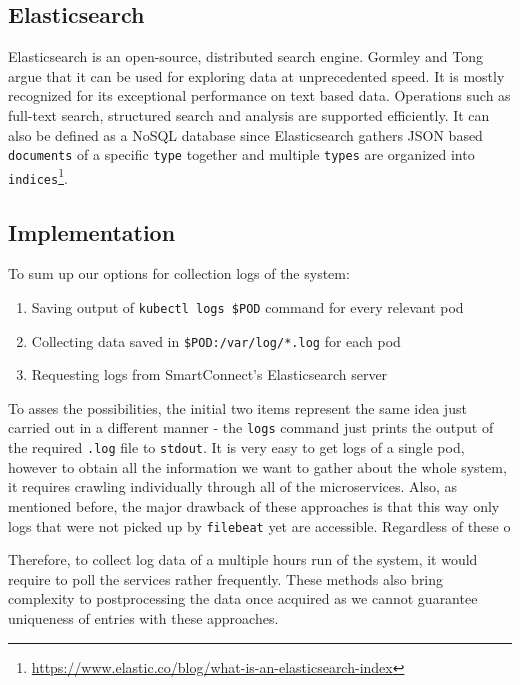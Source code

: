 \subsection{Elasticsearch}
Elasticsearch is an open-source, distributed search engine. Gormley and Tong \cite{gormley2015elasticsearch} argue that it can be used for exploring data at unprecedented speed. It is mostly recognized for its exceptional performance on text based data. Operations such as full-text search, structured search and analysis are supported efficiently.
It can also be defined as a NoSQL database since Elasticsearch gathers JSON based \texttt{documents} of a specific \texttt{type} together and multiple \texttt{types} are organized into \texttt{indices}\footnote{\url{https://www.elastic.co/blog/what-is-an-elasticsearch-index}}. 

\subsection{Implementation}

To sum up our options for collection logs of the system:
\begin{enumerate}
    \item Saving output of \texttt{kubectl logs \${POD}} command for every relevant pod
    \item Collecting data saved in \texttt{\${POD}:/var/log/*.log} for each pod
    \item Requesting logs from SmartConnect's Elasticsearch server
\end{enumerate}

To asses the possibilities, the initial two items represent the same idea just carried out in a different manner - the \texttt{logs} command just prints the output of the required \texttt{.log} file to \texttt{stdout}. 
It is very easy to get logs of a single pod, however to obtain all the information we want to gather about the whole system, it requires crawling individually through all of the microservices. Also, as mentioned before, the major drawback of these approaches is that this way only logs that were not picked up by \texttt{filebeat} yet are accessible. Regardless of these o

Therefore, to collect log data of a multiple hours run of the system, it would require to poll the services rather frequently. These methods also bring complexity to postprocessing the data once acquired as we cannot guarantee uniqueness of entries with these approaches.

